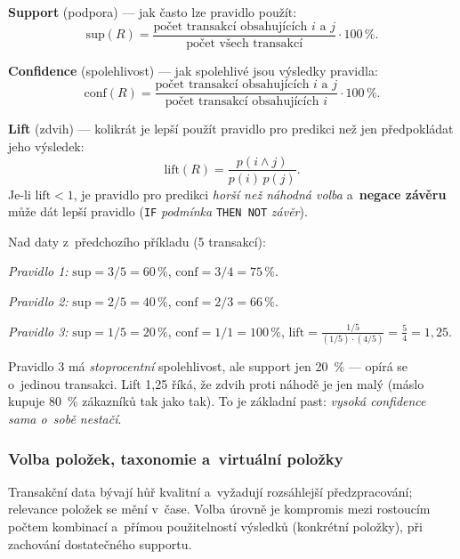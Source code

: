 \documentclass[11pt,a4paper]{article}
\theoremstyle{definition}
\begin{document}
\begin{defbox}
\textbf{Support} (podpora) --- jak často lze pravidlo použít:
\[ \mathrm{sup}(R)=\frac{\text{počet transakcí obsahujících } i \text{ a } j}
   {\text{počet všech transakcí}}\cdot 100\,\%. \]

\textbf{Confidence} (spolehlivost) --- jak spolehlivé jsou výsledky pravidla:
\[ \mathrm{conf}(R)=\frac{\text{počet transakcí obsahujících } i \text{ a } j}
   {\text{počet transakcí obsahujících } i}\cdot 100\,\%. \]

\textbf{Lift} (zdvih) --- kolikrát je lepší použít pravidlo pro predikci než jen předpokládat
jeho výsledek:
\[ \mathrm{lift}(R)=\frac{p(i\wedge j)}{p(i)\,p(j)}. \]
Je-li $\mathrm{lift}<1$, je pravidlo pro predikci \emph{horší než náhodná volba}
a~\textbf{negace závěru} může dát lepší pravidlo (\texttt{IF} \emph{podmínka} \texttt{THEN
NOT} \emph{závěr}).
\end{defbox}

\begin{defbox}
Nad daty z~předchozího příkladu (5 transakcí):

\emph{Pravidlo 1:} 
$\mathrm{sup}=3/5=60\,\%$, $\mathrm{conf}=3/4=75\,\%$.

\emph{Pravidlo 2:} 
$\mathrm{sup}=2/5=40\,\%$, $\mathrm{conf}=2/3=66\,\%$.

\emph{Pravidlo 3:} 
$\mathrm{sup}=1/5=20\,\%$, $\mathrm{conf}=1/1=100\,\%$,
$\mathrm{lift}=\frac{1/5}{(1/5)\cdot(4/5)}=\frac54=1{,}25$.

Pravidlo 3 má \emph{stoprocentní} spolehlivost, ale support jen 20~\% --- opírá se o~jedinou
transakci. Lift 1,25 říká, že zdvih proti náhodě je jen malý (máslo kupuje 80~\% zákazníků
tak jako tak). To je základní past: \emph{vysoká confidence sama o~sobě nestačí}.
\end{defbox}

\subsubsection{Volba položek, taxonomie a~virtuální položky}

Transakční data bývají hůř kvalitní a~vyžadují rozsáhlejší předzpracování; relevance položek
se mění v~čase. Volba úrovně je kompromis mezi rostoucím počtem kombinací a~přímou
použitelností výsledků (konkrétní položky), při zachování dostatečného supportu.
\end{document}
